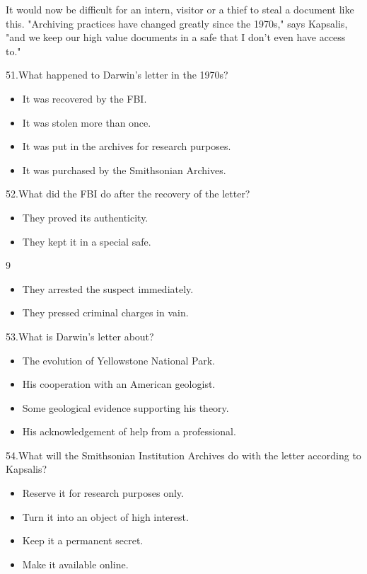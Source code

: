 \documentclass[UTF8,11pt]{ctexart}
\begin{document}
It would now be difficult for an intern, visitor or a thief to steal a document like this. "Archiving practices have changed greatly since the 1970s," says Kapsalis, "and we keep our high value documents in a safe that I don't even have access to."


51.What happened to Darwin's letter in the 1970s?


\begin{itemize}[leftmargin=2em,itemsep=.2em,topsep=.4em]\item[A.] It was recovered by the FBI.
\item[B.] It was stolen more than once.
\item[C.] It was put in the archives for research purposes.
\item[D.] It was purchased by the Smithsonian Archives.
\end{itemize}

52.What did the FBI do after the recovery of the letter?


\begin{itemize}[leftmargin=2em,itemsep=.2em,topsep=.4em]\item[A.] They proved its authenticity.
\item[B.] They kept it in a special safe.
\end{itemize}

9


\begin{itemize}[leftmargin=2em,itemsep=.2em,topsep=.4em]\item[C.] They arrested the suspect immediately.
\item[D.] They pressed criminal charges in vain.
\end{itemize}

53.What is Darwin's letter about?


\begin{itemize}[leftmargin=2em,itemsep=.2em,topsep=.4em]\item[A.] The evolution of Yellowstone National Park.
\item[B.] His cooperation with an American geologist.
\item[C.] Some geological evidence supporting his theory.
\item[D.] His acknowledgement of help from a professional.
\end{itemize}

54.What will the Smithsonian Institution Archives do with the letter according to Kapsalis?


\begin{itemize}[leftmargin=2em,itemsep=.2em,topsep=.4em]\item[A.] Reserve it for research purposes only.
\item[B.] Turn it into an object of high interest.
\item[C.] Keep it a permanent secret.
\item[D.] Make it available online.
\end{itemize}
\end{document}
